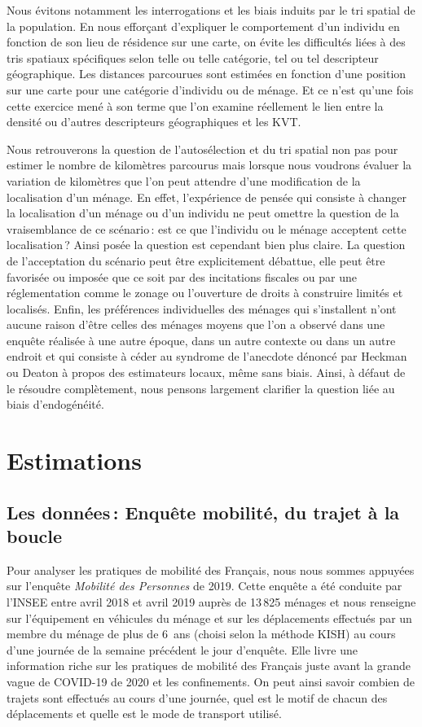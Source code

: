 \documentclass[
  9pt,
  a4paper,
  DIV=11]{scrreprt}
\begin{document}
Nous évitons notamment les interrogations et les biais induits par le
tri spatial de la population. En nous efforçant d'expliquer le
comportement d'un individu en fonction de son lieu de résidence sur une
carte, on évite les difficultés liées à des tris spatiaux spécifiques
selon telle ou telle catégorie, tel ou tel descripteur géographique. Les
distances parcourues sont estimées en fonction d'une position sur une
carte pour une catégorie d'individu ou de ménage. Et ce n'est qu'une
fois cette exercice mené à son terme que l'on examine réellement le lien
entre la densité ou d'autres descripteurs géographiques et les KVT.

Nous retrouverons la question de l'autosélection et du tri spatial non
pas pour estimer le nombre de kilomètres parcourus mais lorsque nous
voudrons évaluer la variation de kilomètres que l'on peut attendre d'une
modification de la localisation d'un ménage. En effet, l'expérience de
pensée qui consiste à changer la localisation d'un ménage ou d'un
individu ne peut omettre la question de la vraisemblance de ce
scénario\,: est ce que l'individu ou le ménage acceptent cette
localisation\,? Ainsi posée la question est cependant bien plus claire.
La question de l'acceptation du scénario peut être explicitement
débattue, elle peut être favorisée ou imposée que ce soit par des
incitations fiscales ou par une réglementation comme le zonage ou
l'ouverture de droits à construire limités et localisés. Enfin, les
préférences individuelles des ménages qui s'installent n'ont aucune
raison d'être celles des ménages moyens que l'on a observé dans une
enquête réalisée à une autre époque, dans un autre contexte ou dans un
autre endroit et qui consiste à céder au syndrome de l'anecdote dénoncé
par Heckman ou Deaton à propos des estimateurs locaux, même sans biais.
Ainsi, à défaut de le résoudre complètement, nous pensons largement
clarifier la question liée au biais d'endogénéité.

\chapter{Estimations}\label{estimations}

\section{Les données\,: Enquête mobilité, du trajet à la
boucle}\label{les-donnuxe9es-enquuxeate-mobilituxe9-du-trajet-uxe0-la-boucle}

Pour analyser les pratiques de mobilité des Français, nous nous sommes
appuyées sur l'enquête \emph{Mobilité des Personnes} de 2019. Cette
enquête a été conduite par l'INSEE entre avril 2018 et avril 2019 auprès
de 13\,825 ménages et nous renseigne sur l'équipement en véhicules du
ménage et sur les déplacements effectués par un membre du ménage de plus
de 6~ans (choisi selon la méthode KISH) au cours d'une journée de la
semaine précédent le jour d'enquête. Elle livre une information riche
sur les pratiques de mobilité des Français juste avant la grande vague
de COVID-19 de 2020 et les confinements. On peut ainsi savoir combien de
trajets sont effectués au cours d'une journée, quel est le motif de
chacun des déplacements et quelle est le mode de transport utilisé.
\end{document}
